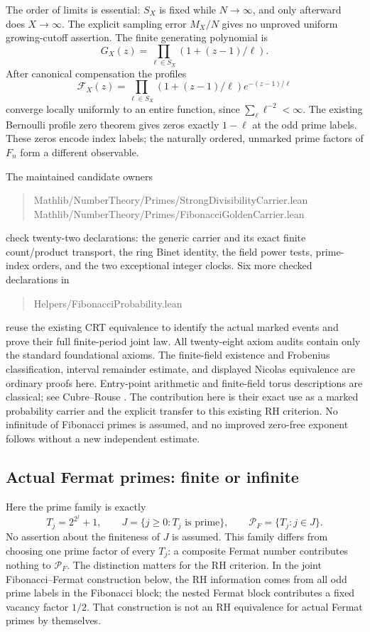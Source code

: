 \documentclass[11pt]{article}
\theoremstyle{definition}
\begin{document}
The order of limits is essential: $S_X$ is fixed while
$N\to\infty$, and only afterward does $X\to\infty$.
The explicit sampling error $M_X/N$ gives no unproved uniform
growing-cutoff assertion. The finite generating polynomial is
\[
 G_X(z)=\prod_{\ell\in S_X}(1+(z-1)/\ell).
\]
After canonical compensation the profiles
\[
 \mathcal F_X(z)=
 \prod_{\ell\in S_X}
   (1+(z-1)/\ell)e^{-(z-1)/\ell}
\]
converge locally uniformly to an entire function, since
$\sum_\ell\ell^{-2}<\infty$. The existing Bernoulli profile
zero theorem gives zeros exactly $1-\ell$ at the odd prime labels.
These zeros encode index labels; the naturally ordered,
unmarked prime factors of $F_n$ form a different observable.

The maintained candidate owners
\begin{quote}\small\ttfamily
Mathlib/NumberTheory/Primes/StrongDivisibilityCarrier.lean\\
Mathlib/NumberTheory/Primes/FibonacciGoldenCarrier.lean
\end{quote}
check twenty-two declarations: the generic carrier and its exact
finite count/product transport, the ring Binet identity, the
field power tests, prime-index orders, and the two exceptional
integer clocks. Six more checked declarations in
\begin{quote}\small\ttfamily
Helpers/FibonacciProbability.lean
\end{quote}
reuse the existing CRT equivalence to identify the actual marked
events and prove their full finite-period joint law.
All twenty-eight axiom audits contain only the standard
foundational axioms. The finite-field existence and Frobenius
classification, interval remainder estimate, and displayed
Nicolas equivalence are ordinary proofs here.
Entry-point arithmetic and finite-field torus descriptions are
classical; see Cubre--Rouse \cite{CubreRouse}.
The contribution here is their exact use as a marked probability
carrier and the explicit transfer to this existing RH criterion.
No infinitude of Fibonacci primes is assumed, and no improved
zero-free exponent follows without a new independent estimate.

\subsection{Actual Fermat primes: finite or infinite}
\label{sec:actual-fermat-prime-rh}

Here the prime family is exactly
\[
 T_j=2^{2^j}+1,\qquad
 J=\{j\ge0:T_j\text{ is prime}\},\qquad
 \mathcal P_F=\{T_j:j\in J\}.
\]
No assertion about the finiteness of $J$ is assumed. This family
differs from choosing one prime factor of every $T_j$: a composite
Fermat number contributes nothing to $\mathcal P_F$.
The distinction matters for the RH criterion. In the joint
Fibonacci--Fermat construction below, the RH information comes
from all odd prime labels in the Fibonacci block; the nested
Fermat block contributes a fixed vacancy factor $1/2$.
That construction is not an RH equivalence for actual Fermat
primes by themselves.
\end{document}
